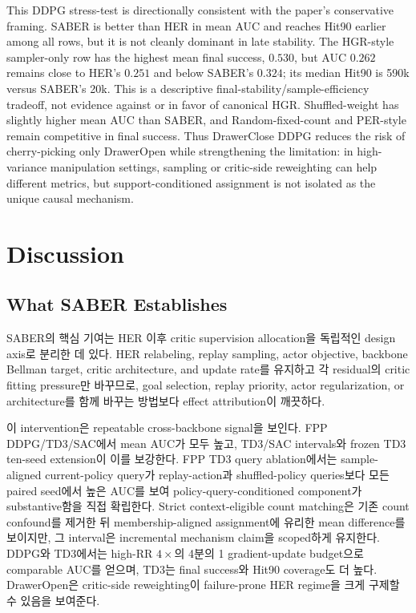 \documentclass[letterpaper]{article}
\begin{document}
This DDPG stress-test is directionally consistent with the paper's conservative framing. SABER is better than HER in mean AUC and reaches Hit90 earlier among all rows, but it is not cleanly dominant in late stability. The HGR-style sampler-only row has the highest mean final success, \(0.530\), but AUC \(0.262\) remains close to HER's \(0.251\) and below SABER's \(0.324\); its median Hit90 is 590k versus SABER's 20k. This is a descriptive final-stability/sample-efficiency tradeoff, not evidence against or in favor of canonical HGR. Shuffled-weight has slightly higher mean AUC than SABER, and Random-fixed-count and PER-style remain competitive in final success. Thus DrawerClose DDPG reduces the risk of cherry-picking only DrawerOpen while strengthening the limitation: in high-variance manipulation settings, sampling or critic-side reweighting can help different metrics, but support-conditioned assignment is not isolated as the unique causal mechanism.

\section{Discussion}

\subsection{What SABER Establishes}

SABER의 핵심 기여는 HER 이후 critic supervision allocation을 독립적인 design axis로 분리한 데 있다. HER relabeling, replay sampling, actor objective, backbone Bellman target, critic architecture, and update rate를 유지하고 각 residual의 critic fitting pressure만 바꾸므로, goal selection, replay priority, actor regularization, or architecture를 함께 바꾸는 방법보다 effect attribution이 깨끗하다.

이 intervention은 repeatable cross-backbone signal을 보인다. FPP DDPG/TD3/SAC에서 mean AUC가 모두 높고, TD3/SAC intervals와 frozen TD3 ten-seed extension이 이를 보강한다. FPP TD3 query ablation에서는 sample-aligned current-policy query가 replay-action과 shuffled-policy queries보다 모든 paired seed에서 높은 AUC를 보여 policy-query-conditioned component가 substantive함을 직접 확립한다. Strict context-eligible count matching은 기존 count confound를 제거한 뒤 membership-aligned assignment에 유리한 mean difference를 보이지만, 그 interval은 incremental mechanism claim을 scoped하게 유지한다. DDPG와 TD3에서는 high-RR \(4\times\)의 4분의 1 gradient-update budget으로 comparable AUC를 얻으며, TD3는 final success와 Hit90 coverage도 더 높다. DrawerOpen은 critic-side reweighting이 failure-prone HER regime을 크게 구제할 수 있음을 보여준다.
\end{document}
